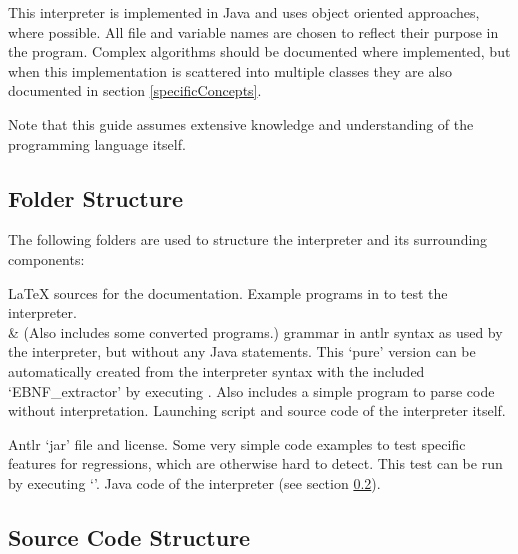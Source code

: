 This interpreter is implemented in Java and uses object oriented approaches, where possible. All file and variable names are chosen to reflect their purpose in the program. Complex algorithms should be documented where implemented, but when this implementation is scattered into multiple classes they are also documented in section \ref{specificConcepts}.

Note that this guide assumes extensive knowledge and understanding of the \SetlX{} programming language itself.


\subsection{Folder Structure}

The following folders are used to structure the interpreter and its surrounding components:

\begin{itemize}
			{\LaTeX{} sources for the documentation.}
			{Example programs in \SetlX{} to test the interpreter.\\&
			 (Also includes some converted \SetlTwo{} programs.)}
			{\SetlX{} grammar in antlr syntax as used by the interpreter, but without any Java statements. This `pure' version can be automatically created from the interpreter syntax with the included `EBNF\_extractor' by executing . Also includes a simple program to parse \SetlX{} code without interpretation.}
			{Launching script and source code of the interpreter itself.}
	\begin{itemize}
				{Antlr `jar' file and license.}
				{Some very simple \SetlX{} code examples to test specific features for regressions, which are otherwise hard to detect. This test can be run by executing `'.}
				{Java code of the interpreter (see section \ref{srcStructure}).}
	\end{itemize}
\end{itemize}

\subsection{Source Code Structure}\label{srcStructure}

